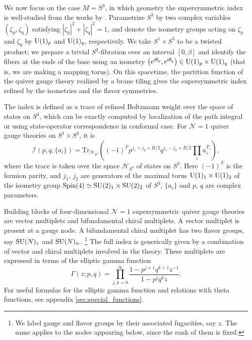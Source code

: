 We now focus on the case $M=S^{3}$, in which geometry the supersymmetric
index is well-studied from the works by \cite{Romelsberger:2005eg,Kinney:2005ej,Festuccia:2011ws,Closset:2013vra}.
Parametrize $S^{3}$ by two complex variables
$(\zeta_{p},\zeta_{q})$ satisfying $|\zeta_{p}|^{2}+|\zeta_{q}|^{2}=1$,
and denote the isometry groups acting on $\zeta_{p}$ and $\zeta_{q}$
by $\mathrm{U}(1)_{p}$ and $\mathrm{U}(1)_{q}$, respectively. We take $S^{1}\times S^{3}$
to be a twisted product; we prepare a trivial $S^{3}$-fibration over
an interval $[0,\beta]$ and identify the fibers at the ends of the
base using an isometry $\left(e^{\mathrm{i}\theta_{p}},e^{\mathrm{i}\theta_{q}}\right)\in \mathrm{U}(1)_{p}\times \mathrm{U}(1)_{q}$
(that is, we are making a mapping torus).
On this spacetime, the partition function of the quiver gauge theory
realized by a brane tiling gives the supersymmetric index refined
by the isometries and the flavor symmetries.

The index is defined as a trace of refined Boltzmann weight over the
space of states on $S^{3}$, which can be exactly computed by localization of the path integral
or using state-operator correspondence in conformal case.
For $\mathcal{N}=1$ quiver gauge theories on $S^{1}\times S^{3}$, it is
\begin{equation}
    \mathcal{I}(p,q,\{ a_{i}\} )
      =  \mathrm{Tr}_{\mathcal{H}_{S^{3}}}
      \left(    (-1)^{F}  p^{j_{1}+j_{2}+R/2}  q^{j_{1}-j_{2}+R/2}  \prod_{i}a_{i}^{F_{i}}    \right),
\end{equation}
where the trace is taken over the space $\mathcal{H}_{S^{3}}$ of states on $S^{3}$.
Here $\left(-1\right)^{F}$ is the fermion parity, and $j_{1},\,j_{2}$
are generators of the maximal torus $\mathrm{U}(1)_{1}\times \mathrm{U}(1)_{2}$ of
the isometry group $\mathrm{Spin}(4)\simeq \mathrm{SU}(2)_{1}\times \mathrm{SU}(2)_{2}$ of $S^{3}$,
$\{ a_i \}$ and $p,\,q$ are complex parameters.


Building blocks of four-dimensional $\mathcal{N}=1$ supersymmetric quiver gauge
theories are vector multiplets and bifundamental chiral multiplets.
A vector multiplet is present at a gauge node. A bifundamental chiral
multiplet has two flavor groups, say $\mathrm{SU}(N)_{z}$ and $\mathrm{SU}(N)_{w}$.%
%
\footnote{We label gauge and flavor groups by their associated fugacities, say $z$.
The same applies to the nodes appearing below, since the rank of them is fixed.}
%
The full index is generically given by a combination of vector and chiral
multiplets involved in the theory. These multiplets are expressed
in terms of the elliptic gamma function
\begin{equation}
    \Gamma(z;p,q)  =  \prod_{j,k=0}^{\infty}  \frac{1-p^{j+1}q^{k+1}z^{-1}}{1-p^{j}q^{k}z}
  .
\end{equation}
For useful formulas for the elliptic gamma function and
relations with theta functions, see appendix \ref{sec:special_functions}.




